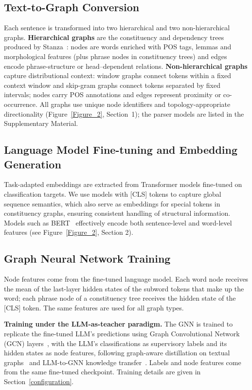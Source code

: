 \subsection{Text-to-Graph Conversion} \label{data_preprocessing}

Each sentence is transformed into two hierarchical and two non-hierarchical graphs. \textbf{Hierarchical graphs} are the constituency and dependency trees produced by Stanza~\cite{qi2020stanza}: nodes are words enriched with POS tags, lemmas and morphological features (plus phrase nodes in constituency trees) and edges encode phrase-structure or head--dependent relations. \textbf{Non-hierarchical graphs} capture distributional context: window graphs connect tokens within a fixed context window and skip-gram graphs connect tokens separated by fixed intervals; nodes carry POS annotations and edges represent proximity or co-occurrence. All graphs use unique node identifiers and topology-appropriate directionality (Figure~\ref{Figure_2}, Section~1); the parser models are listed in the Supplementary Material.

\subsection{Language Model Fine-tuning and Embedding Generation} \label{fine-tuning}

Task-adapted embeddings are extracted from Transformer models fine-tuned on classification targets. We use models with [CLS] tokens to capture global sequence semantics, which also serve as embeddings for special tokens in constituency graphs, ensuring consistent handling of structural information. Models such as BERT~\cite{devlin2019bert} effectively encode both sentence-level and word-level features (see Figure~\ref{Figure_2}, Section 2).

\subsection{Graph Neural Network Training} \label{gnn}

Node features come from the fine-tuned language model. Each word node receives the mean of the last-layer hidden states of the subword tokens that make up the word; each phrase node of a constituency tree receives the hidden state of the [CLS] token. The same features are used for all graph types.

\textbf{Training under the LLM-as-teacher paradigm.} The GNN is trained to replicate the fine-tuned LLM's predictions using Graph Convolutional Network (GCN) layers~\cite{kipf2017semisupervisedclassificationgraphconvolutional}, with the LLM's classifications as supervisory labels and its hidden states as node features, following graph-aware distillation on textual graphs~\cite{mavromatis2023traingnnteachergraphaware} and LLM-to-GNN knowledge transfer~\cite{li2024enhancinggraphneuralnetworks,hu2024largelanguagemodelmeets}. Labels and node features come from the same fine-tuned checkpoint. Training details are given in Section~\ref{configuration}.

